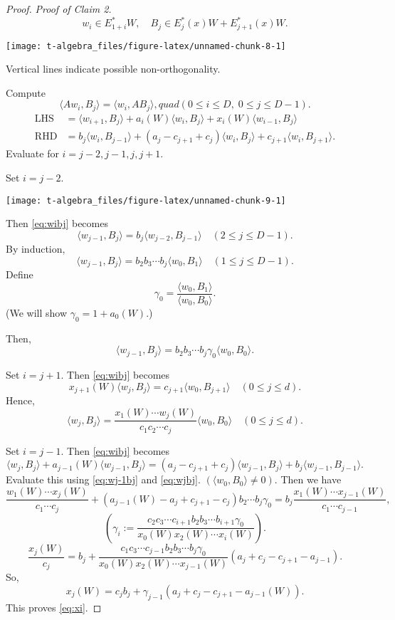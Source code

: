 \documentclass[
]{book}
\theoremstyle{definition}
\theoremstyle{definition}
\theoremstyle{definition}
\theoremstyle{definition}
\theoremstyle{remark}
\begin{document}
\begin{proof}
\emph{Proof of Claim 2.}
\[w_i\in E^*_{1+i}W, \quad B_j\in E^*_j(x)W + E^*_{j+1}(x)W.\]

\begin{center}\texttt{[image: t-algebra\_files/figure-latex/unnamed-chunk-8-1]} \end{center}

Vertical lines indicate possible non-orthogonality.

Compute
\begin{equation}
\langle Aw_i, B_j\rangle = \langle w_i, AB_j\rangle, quad (0\leq i\leq D, \; 0\leq j\leq D-1).\label{eq:wibj}
\end{equation}
\begin{align}
\text{LHS} & = \langle w_{i+1},B_j\rangle + a_i(W)\langle w_i,B_j\rangle + x_i(W)\langle w_{i-1},B_j\rangle\\
\text{RHD}& = b_j\langle w_i, B_{j-1}\rangle + (a_j-c_{j+1}+c_j)\langle w_i, B_j\rangle + c_{j+1}\langle w_i, B_{j+1}\rangle.
\end{align}
Evaluate for \(i = j-2, j-1, j, j+1\).

Set \(i = j-2\).

\begin{center}\texttt{[image: t-algebra\_files/figure-latex/unnamed-chunk-9-1]} \end{center}

Then \eqref{eq:wibj} becomes
\[\langle w_{j-1}, B_j\rangle = b_j\langle w_{j-2},B_{j-1}\rangle \quad (2\leq j\leq D-1).\]
By induction,
\[\langle w_{j-1}, B_j\rangle = b_2b_3\cdots b_j\langle w_{0},B_{1}\rangle \quad (1\leq j\leq D-1).\]
Define
\[\gamma_0 = \frac{\langle w_0, B_1\rangle}{\langle w_0, B_0\rangle}.\]
(We will show \(\gamma_0 = 1+a_0(W)\).)

Then,
\begin{equation}
\langle w_{j-1},B_j\rangle = b_2b_3\cdots b_j\gamma_0\langle w_0, B_0\rangle. \label{eq:wj-1bj}
\end{equation}

Set \(i = j+1\).
Then \eqref{eq:wibj} becomes
\[x_{j+1}(W)\langle w_j, B_j\rangle = c_{j+1}\langle w_0, B_{j+1}\rangle \quad (0\leq j\leq d).\]
Hence,
\begin{equation}
\langle w_j, B_j\rangle = \frac{x_1(W)\cdots w_j(W)}{c_1c_2\cdots c_j}\langle w_0, B_0\rangle \quad (0\leq j\leq d). \label{eq:wjbj}
\end{equation}

Set \(i = j-1\).
Then \eqref{eq:wibj} becomes
\[
\langle w_j, B_j\rangle + a_{j-1}(W)\langle w_{j-1}, B_j\rangle
 = (a_j-c_{j+1}+c_j)\langle w_{j-1},B_j\rangle + b_j\langle w_{j-1},B_{j-1}\rangle.
\]
Evaluate this using \eqref{eq:wj-1bj} and \eqref{eq:wjbj}. \((\langle w_0, B_0\rangle \neq 0)\). Then we have
\[\frac{w_1(W)\cdots x_j(W)}{c_1\cdots c_j}+(a_{j-1}(W)-a_j+c_{j+1}-c_j)b_2\cdots b_j\gamma_0 = b_j\frac{x_1(W)\cdots x_{j-1}(W)}{c_1\cdots c_{j-1}},\]
\[\left(\gamma_i:=\frac{c_2c_3\cdots c_{i+1}b_2b_3\cdots b_{i+1}\gamma_0}{x_0(W)x_2(W)\cdots x_i(W)} \right).\]
\[\frac{x_j(W)}{c_j}  = b_j + \frac{c_1c_3\cdots c_{j-1}b_2b_3\cdots b_{j}\gamma_0}{x_0(W)x_2(W)\cdots x_{j-1}(W)}(a_j+c_j-c_{j+1}-a_{j-1}).\]
So,
\[x_j(W)  = c_jb_j + \gamma_{j-1}(a_j+c_j-c_{j+1}-a_{j-1}(W)).\]
This proves \eqref{eq:xi}.


\end{proof}
\end{document}

